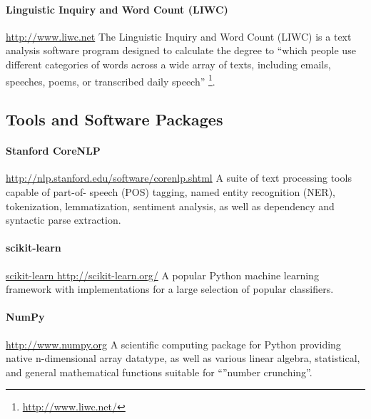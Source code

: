 \documentclass[
10pt, %
a4paper, %
oneside, %
headinclude,footinclude, %
BCOR5mm, %
]{scrartcl}
\begin{document}
\paragraph{\textbf{Linguistic Inquiry and Word Count (LIWC)}}
\hfill \newline \noindent \url{http://www.liwc.net}
\hfill \newline \noindent The Linguistic Inquiry and Word Count (LIWC) is a text
analysis software program designed to calculate the degree to ``which people use 
different categories of words across a wide array of texts, including emails, 
speeches, poems, or transcribed daily speech''
\footnote{\url{http://www.liwc.net/}}.

\subsection{Tools and Software Packages}

\paragraph{\textbf{Stanford CoreNLP}}
\hfill \newline \noindent \url{http://nlp.stanford.edu/software/corenlp.shtml}
\hfill \newline \noindent A suite of text processing tools capable of part-of-
speech (POS) tagging, named entity recognition (NER), tokenization,
lemmatization, sentiment analysis, as well as dependency and syntactic parse
extraction.

\paragraph{\textbf{scikit-learn}}
\hfill \newline \noindent \url{scikit-learn http://scikit-learn.org/}
\hfill \newline \noindent A popular Python machine learning framework with
implementations for a large selection of popular classifiers.

\paragraph{\textbf{NumPy}}
\hfill \newline \noindent \url{http://www.numpy.org}
\hfill \newline \noindent A scientific computing package for Python providing
native n-dimensional array datatype, as well as various linear algebra,
statistical, and general mathematical functions suitable for ``''number
crunching''.
\end{document}
